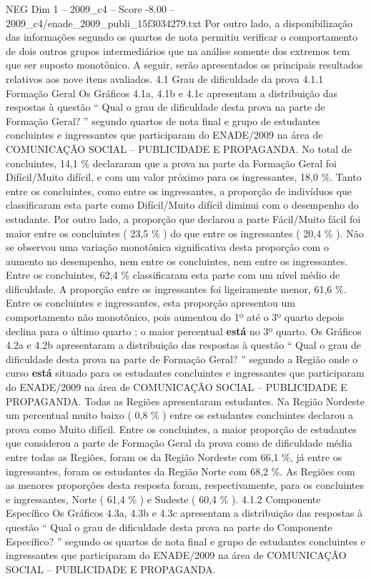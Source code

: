 \begin{textsample}{NEG Dim 1 – 2009\_c4 – Score -8.00 – 2009\_c4/enade\_2009\_publi\_15f3034279.txt}
Por outro lado, a disponibilização das informações segundo os quartos de nota permitiu verificar o comportamento de dois outros grupos intermediários que na análise somente dos extremos tem que ser suposto monotônico.
A seguir, serão apresentados os principais resultados relativos aos nove itens avaliados. 4.1 Grau de dificuldade da prova 4.1.1 Formação Geral Os Gráficos 4.1a, 4.1b e 4.1c apresentam a distribuição das respostas à questão “ Qual o grau de dificuldade desta prova na parte de Formação Geral? ” segundo quartos de nota final e grupo de estudantes concluintes e ingressantes que participaram do ENADE/2009 na área de COMUNICAÇÃO SOCIAL – PUBLICIDADE E PROPAGANDA.
No total de concluintes, 14,1 \% declararam que a prova na parte da Formação Geral foi Difícil/Muito difícil, e com um valor próximo para os ingressantes, 18,0 \%.
Tanto entre os concluintes, como entre os ingressantes, a proporção de indivíduos que classificaram esta parte como Difícil/Muito difícil diminui com o desempenho do estudante.
Por outro lado, a proporção que declarou a parte Fácil/Muito fácil foi maior entre os concluintes ( 23,5 \% ) do que entre os ingressantes ( 20,4 \% ).
Não se observou uma variação monotônica significativa desta proporção com o aumento no desempenho, nem entre os concluintes, nem entre os ingressantes.
Entre os concluintes, 62,4 \% classificaram esta parte com um nível médio de dificuldade.
A proporção entre os ingressantes foi ligeiramente menor, 61,6 \%.
Entre os concluintes e ingressantes, esta proporção apresentou um comportamento não monotônico, pois aumentou do 1º até o 3º quarto depois declina para o último quarto ; o maior percentual \textbf{está} no 3º quarto.
Os Gráficos 4.2a e 4.2b apresentaram a distribuição das respostas à questão “ Qual o grau de dificuldade desta prova na parte de Formação Geral? ” segundo a Região onde o curso \textbf{está} situado para os estudantes concluintes e ingressantes que participaram do ENADE/2009 na área de COMUNICAÇÃO SOCIAL – PUBLICIDADE E PROPAGANDA.
Todas as Regiões apresentaram estudantes.
Na Região Nordeste um percentual muito baixo ( 0,8 \% ) entre os estudantes concluintes declarou a prova como Muito difícil.
Entre os concluintes, a maior proporção de estudantes que considerou a parte de Formação Geral da prova como de dificuldade média entre todas as Regiões, foram os da Região Nordeste com 66,1 \%, já entre os ingressantes, foram os estudantes da Região Norte com 68,2 \%.
As Regiões com as menores proporções desta resposta foram, respectivamente, para os concluintes e ingressantes, Norte ( 61,4 \% ) e Sudeste ( 60,4 \% ). 4.1.2 Componente Específico Os Gráficos 4.3a, 4.3b e 4.3c apresentam a distribuição das respostas à questão “ Qual o grau de dificuldade desta prova na parte do Componente Específico? ” segundo os quartos de nota final e grupo de estudantes concluintes e ingressantes que participaram do ENADE/2009 na área de COMUNICAÇÃO SOCIAL – PUBLICIDADE E PROPAGANDA.

\end{textsample}
